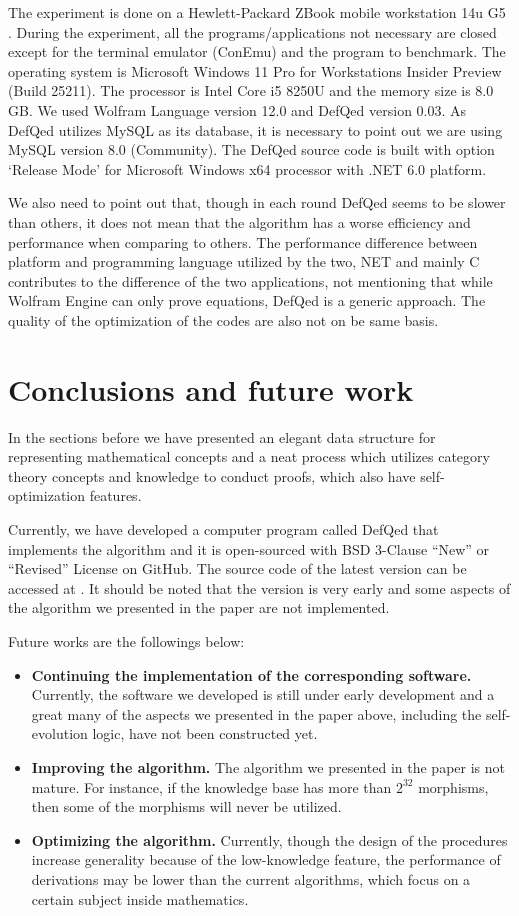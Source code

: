\documentclass{aims}
\numberwithin{equation}{section}
\numberwithin{theorem}{section}	%
\numberwithin{axiom}{section}	%
\numberwithin{definition}{section}	%
\begin{document}
	The experiment is done on a Hewlett-Packard ZBook mobile workstation 14u G5 \cite{HP-2018}. During the experiment, all the programs/applications not necessary are closed except for the terminal emulator (ConEmu) and the program to benchmark. The operating system is Microsoft Windows 11 Pro for Workstations Insider Preview (Build 25211). The processor is Intel Core i5 8250U and the memory size is 8.0 GB. We used Wolfram Language version 12.0 and DefQed version 0.03. As DefQed utilizes MySQL as its database, it is necessary to point out we are using MySQL version 8.0 (Community). The DefQed source code is built with option `Release Mode' for Microsoft Windows x64 processor with .NET 6.0 platform.
	
	We also need to point out that, though in each round DefQed seems to be slower than others, it does not mean that the algorithm has a worse efficiency and performance when comparing to others. The performance difference between platform and programming language utilized by the two, NET and mainly C contributes to the difference of the two applications, not mentioning that while Wolfram Engine can only prove equations, DefQed is a generic approach. The quality of the optimization of the codes are also not on be same basis.
	
	\section{Conclusions and future work}
	
	In the sections before we have presented an elegant data structure for representing mathematical concepts and a neat process which utilizes category theory concepts and knowledge to conduct proofs, which also have self-optimization features.
	
	Currently, we have developed a computer program called DefQed that implements the algorithm and it is open-sourced with BSD 3-Clause {``}New{''} or {``}Revised{''} License on GitHub. The source code of the latest version can be accessed at \cite{Wang2022}. It should be noted that the version is very early and some aspects of the algorithm we presented in the paper are not implemented.
	
	Future works are the followings below:
	\begin{itemize}
		\item \textbf{Continuing the implementation of the corresponding software.} Currently, the software we developed is still under early development and a great many of the aspects we presented in the paper above, including the self-evolution logic, have not been constructed yet.
		\item  \textbf{Improving the algorithm.} The algorithm we presented in the paper is not mature. For instance, if the knowledge base has more than \(2^{32}\) morphisms, then some of the morphisms will never be utilized.
		\item \textbf{Optimizing the algorithm.} Currently, though the design of the procedures increase generality because of the low-knowledge feature, the performance of derivations may be lower than the current algorithms, which focus on a certain subject inside mathematics.
	\end{itemize}
	
\end{document}

